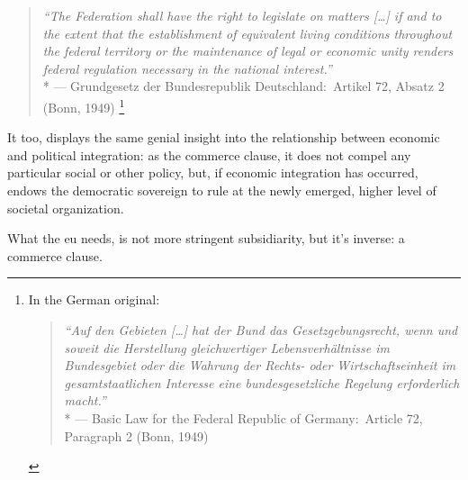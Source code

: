\begin{quote}
	\emph{``The Federation shall have the right to legislate on matters [\ldots] if and to the extent that the establishment of equivalent living conditions throughout the federal territory or the maintenance of legal or economic unity renders federal regulation necessary in the national interest.''}\\*
	--- Grundgesetz der Bundesrepublik Deutschland:\ Artikel 72, Absatz 2 (Bonn, 1949)
	\footnote{
		In the German original:
		\begin{quote}
			\emph{``Auf den Gebieten [\ldots] hat der Bund das Gesetzgebungsrecht, wenn und soweit die Herstellung gleichwertiger Lebensverhältnisse im Bundesgebiet oder die Wahrung der Rechts- oder Wirtschaftseinheit im gesamtstaatlichen Interesse eine bundesgesetzliche Regelung erforderlich macht.''}\\*
			--- Basic Law for the Federal Republic of Germany:\ Article 72, Paragraph 2 (Bonn, 1949)
		\end{quote}
	}
\end{quote}

It too, displays the same genial insight into the relationship between economic and political integration:
as the commerce clause, it does not compel any particular social or other policy, but, if economic integration has occurred, endows the democratic sovereign to rule at the newly emerged, higher level of societal organization.


What the \gls{eu} needs, is not more stringent subsidiarity, but it's inverse:
a commerce clause.




